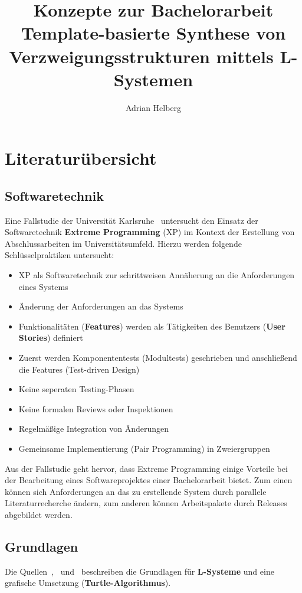 \documentclass[11pt]{article}
\title{\textbf{Konzepte} zur Bachelorarbeit\\\large{Template-basierte Synthese von\\Verzweigungsstrukturen mittels
L-Systemen}}
\author{Adrian Helberg}
\begin{document}
    \maketitle
    \tableofcontents
    \newpage
    \section{Literaturübersicht}
    \subsection{Softwaretechnik}
    Eine Fallstudie der Universität Karlsruhe~\cite{1} untersucht den Einsatz der Softwaretechnik \textbf{Extreme
    Programming}
    (XP) im Kontext der Erstellung von Abschlussarbeiten im Universitätsumfeld.
    Hierzu werden folgende Schlüsselpraktiken untersucht:
    \begin{itemize}
        \item XP als Softwaretechnik zur schrittweisen Annäherung an die Anforderungen eines Systems
        \item Änderung der Anforderungen an das Systems
        \item Funktionalitäten (\textbf{Features}) werden als Tätigkeiten des Benutzers (\textbf{User Stories}) definiert
        \item Zuerst werden Komponententests (Modultests) geschrieben und anschließend die Features (Test-driven Design)
        \item Keine seperaten Testing-Phasen
        \item Keine formalen Reviews oder Inspektionen
        \item Regelmäßige Integration von Änderungen
        \item Gemeinsame Implementierung (Pair Programming) in Zweiergruppen
    \end{itemize}
    Aus der Fallstudie geht hervor, dass Extreme Programming einige Vorteile bei der Bearbeitung eines Softwareprojektes
    einer Bachelorarbeit bietet.
    Zum einen können sich Anforderungen an das zu erstellende System durch parallele Literaturrecherche ändern, zum
    anderen können Arbeitspakete durch Releases abgebildet werden.

    \subsection{Grundlagen}
    Die Quellen~\cite{3},~\cite{4} und~\cite{5} beschreiben die Grundlagen für \textbf{L-Systeme} und eine grafische
    Umsetzung (\textbf{Turtle-Algorithmus}).
\end{document}
